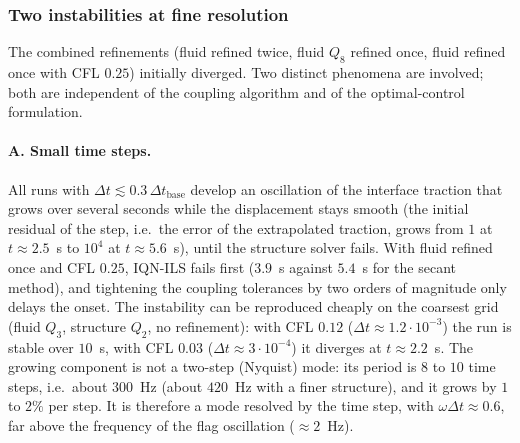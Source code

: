 \documentclass[11pt,a4paper]{article}
\theoremstyle{definition}
\theoremstyle{remark}
\begin{document}
\subsubsection{Two instabilities at fine resolution}\label{sec:instabilities}

The combined refinements (fluid refined twice, fluid $Q_8$ refined once, fluid refined once with
CFL $0.25$) initially diverged. Two distinct phenomena are involved; both are independent of the
coupling algorithm and of the optimal-control formulation.

\paragraph{A. Small time steps.} All runs with $\Delta t\lesssim0.3\,\Delta t_{\mathrm{base}}$
develop an oscillation of the interface traction that grows over several seconds while the
displacement stays smooth (the initial residual of the step, i.e.\ the error of the extrapolated
traction, grows from $1$ at $t\approx2.5$~s to $10^4$ at $t\approx5.6$~s), until the structure
solver fails. With fluid refined once and CFL $0.25$, IQN-ILS fails first ($3.9$~s against $5.4$~s
for the secant method), and tightening the coupling tolerances by two orders of magnitude only
delays the onset. The instability can be reproduced cheaply on the coarsest grid (fluid $Q_3$,
structure $Q_2$, no refinement): with CFL $0.12$ ($\Delta t\approx1.2\cdot10^{-3}$) the run is
stable over $10$~s, with CFL $0.03$ ($\Delta t\approx3\cdot10^{-4}$) it diverges at $t\approx2.2$~s.
The growing component is not a two-step (Nyquist) mode: its period is $8$ to $10$ time steps, i.e.\
about $300$~Hz (about $420$~Hz with a finer structure), and it grows by $1$ to $2\%$ per step. It
is therefore a mode resolved by the time step, with $\omega\Delta t\approx0.6$, far above the
frequency of the flag oscillation ($\approx2$~Hz).
\end{document}
